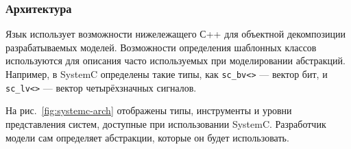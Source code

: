 \subsubsection{Архитектура}

Язык использует возможности нижележащего С++ для объектной декомпозиции разрабатываемых моделей. Возможности определения шаблонных классов используются для описания часто используемых при моделировании абстракций. Например, в SystemC определены такие типы, как \texttt{sc_bv<>} --- вектор бит, и \texttt{sc_lv<>} --- вектор четырёхзначных сигналов.

На рис.~\ref{fig:systemc-arch} отображены типы, инструменты и уровни представления систем, доступные при использовании SystemC. Разработчик модели сам определяет абстракции, которые он будет использовать.

